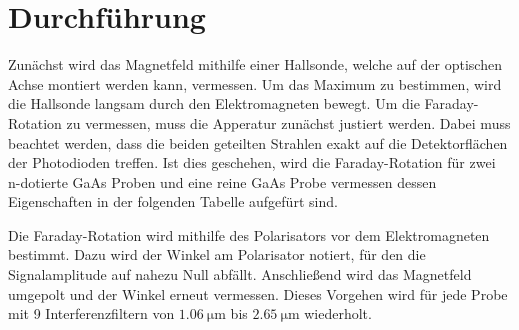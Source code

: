 \section{Durchführung}
Zunächst wird das Magnetfeld mithilfe einer Hallsonde, welche auf der optischen Achse montiert werden kann, vermessen.
Um das Maximum zu bestimmen, wird die Hallsonde langsam durch den Elektromagneten bewegt.
Um die Faraday-Rotation zu vermessen, muss die Apperatur zunächst justiert werden. Dabei muss beachtet werden, dass
die beiden geteilten Strahlen exakt auf die Detektorflächen der Photodioden treffen.
Ist dies geschehen, wird die Faraday-Rotation für zwei n-dotierte GaAs Proben und eine reine GaAs Probe vermessen dessen
Eigenschaften in der folgenden Tabelle aufgefürt sind.



Die Faraday-Rotation wird mithilfe des Polarisators vor dem Elektromagneten bestimmt. Dazu wird der Winkel am Polarisator notiert,
für den die Signalamplitude auf nahezu Null abfällt. Anschließend wird das Magnetfeld umgepolt und der Winkel erneut vermessen.
Dieses Vorgehen wird für jede Probe mit 9 Interferenzfiltern von $\SI{1,06}{\micro\metre}$ bis $\SI{2,65}{\um}$ wiederholt. 
